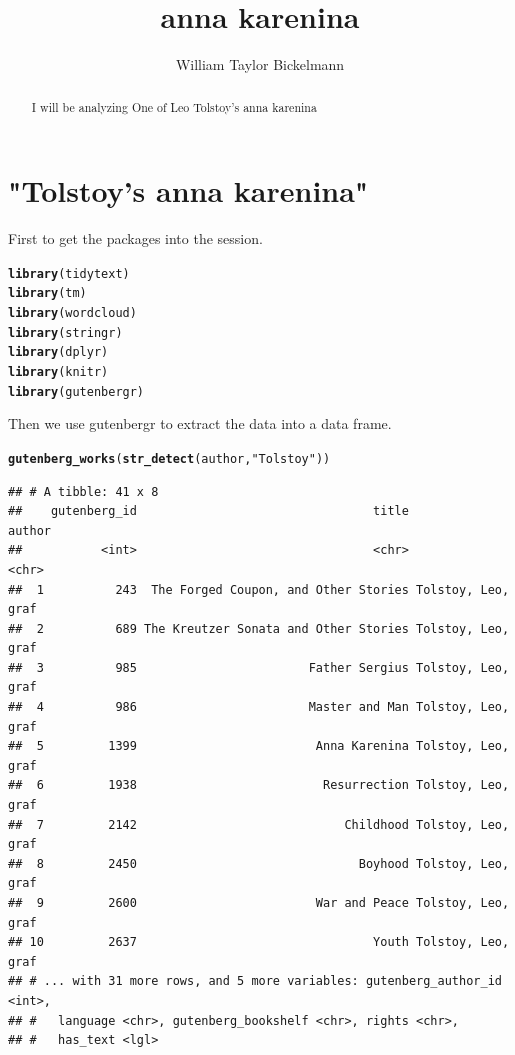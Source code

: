 \documentclass{article}\usepackage[]{graphicx}\usepackage[]{color}
\makeatletter
\newcommand{\hlstr}[1]{\textcolor[rgb]{0.192,0.494,0.8}{#1}}%
\newcommand{\hlstd}[1]{\textcolor[rgb]{0.345,0.345,0.345}{#1}}%
\newcommand{\hlkwd}[1]{\textcolor[rgb]{0.737,0.353,0.396}{\textbf{#1}}}%
\newenvironment{kframe}{%
 \def\at@end@of@kframe{}%
 \ifinner\ifhmode%
  \def\at@end@of@kframe{\end{minipage}}%
  \begin{minipage}{\columnwidth}%
 \fi\fi%
 \def\FrameCommand##1{\hskip\@totalleftmargin \hskip-\fboxsep
 \colorbox{shadecolor}{##1}\hskip-\fboxsep
     \hskip-\linewidth \hskip-\@totalleftmargin \hskip\columnwidth}%
 \MakeFramed {\advance\hsize-\width
   \@totalleftmargin\z@ \linewidth\hsize
   \@setminipage}}%
 {\par\unskip\endMakeFramed%
 \at@end@of@kframe}
\newenvironment{knitrout}{}{} %
\makeatother
\begin{document}
\title{anna karenina}
\author{William Taylor Bickelmann}
\maketitle



\begin{abstract}
I will be analyzing One of Leo Tolstoy's anna karenina
\end{abstract}

\section{"Tolstoy's anna karenina"}
First to get the packages into the session.

\begin{knitrout}
\color{fgcolor}\begin{kframe}
\begin{alltt}
\hlkwd{library}\hlstd{(tidytext)}
\hlkwd{library}\hlstd{(tm)}
\hlkwd{library}\hlstd{(wordcloud)}
\hlkwd{library}\hlstd{(stringr)}
\hlkwd{library}\hlstd{(dplyr)}
\hlkwd{library}\hlstd{(knitr)}
\hlkwd{library}\hlstd{(gutenbergr)}
\end{alltt}
\end{kframe}
\end{knitrout}

\noindent Then we use gutenbergr to extract the data into a data frame.

\begin{knitrout}
\color{fgcolor}\begin{kframe}
\begin{alltt}
\hlkwd{gutenberg_works}\hlstd{(}\hlkwd{str_detect}\hlstd{(author,} \hlstr{"Tolstoy"}\hlstd{))}
\end{alltt}
\begin{verbatim}
## # A tibble: 41 x 8
##    gutenberg_id                                 title             author
##           <int>                                 <chr>              <chr>
##  1          243  The Forged Coupon, and Other Stories Tolstoy, Leo, graf
##  2          689 The Kreutzer Sonata and Other Stories Tolstoy, Leo, graf
##  3          985                        Father Sergius Tolstoy, Leo, graf
##  4          986                        Master and Man Tolstoy, Leo, graf
##  5         1399                         Anna Karenina Tolstoy, Leo, graf
##  6         1938                          Resurrection Tolstoy, Leo, graf
##  7         2142                             Childhood Tolstoy, Leo, graf
##  8         2450                               Boyhood Tolstoy, Leo, graf
##  9         2600                         War and Peace Tolstoy, Leo, graf
## 10         2637                                 Youth Tolstoy, Leo, graf
## # ... with 31 more rows, and 5 more variables: gutenberg_author_id <int>,
## #   language <chr>, gutenberg_bookshelf <chr>, rights <chr>,
## #   has_text <lgl>
\end{verbatim}
\end{kframe}
\end{knitrout}
\end{document}
